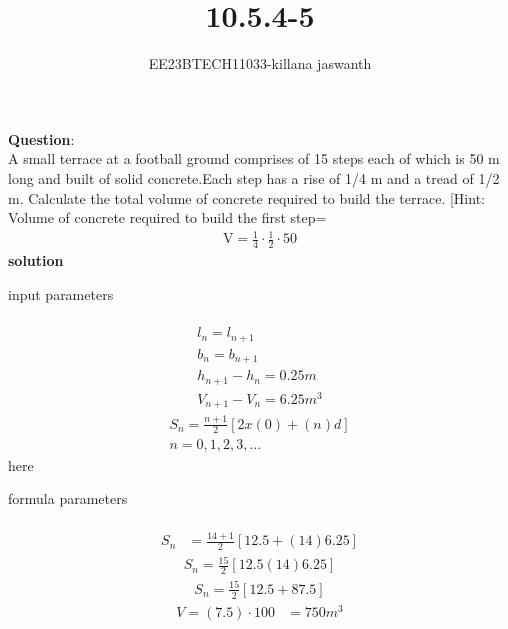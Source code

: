 \documentclass[journal,12pt,twocolumn]{IEEEtran}
\theoremstyle{remark}
\begin{document}

\vspace{3cm}

\title{10.5.4-5}
\author{EE23BTECH11033-killana jaswanth}
\maketitle
\newpage

\bigskip

\renewcommand{\thefigure}{\theenumi}
\renewcommand{\thetable}{\theenumi}
\textbf{Question}:\\
A small terrace at a football ground comprises of 15 steps each of which is 50
m long and built of solid concrete.Each step has a rise of 1/4 m and a tread of
1/2 m. Calculate the total volume of concrete required to build the terrace.
[Hint: Volume of concrete required to build the first step=\begin{align}
    \text{{V}}=\frac{1}{4} \cdot \frac{1}{2} \cdot 50 
\end{align}
\textbf{solution} 
\begin{table}[!ht]
 \centering
  
   \caption{input parameters}
   \label{tab:10.5.4.5}
   \end{table}
\begin{align}
\\l{_{n}}=l{_{n+1}}
\\b{_{n}}=b{_{n+1}}
\\h{_{n+1}}-h{_{n}}=0.25m
\\V{_{n+1}}-V{_{n}}=6.25m^3
\end{align}
\begin{align}
S_n = \frac{n+1}{2} [2x(0)+(n)d]   
\\n=0,1,2,3,...
\end{align}
here\\\begin{table}[!ht]
 \centering
  
   \caption{formula parameters}
   \label{tab:10.5.4.5}
   \end{table}
\begin{align}\\S_n &= \frac{14+1}{2} [12.5+(14)6.25]
\end{align}
\begin{align}
S_n = \frac{15}{2}[12.5(14)6.25]
\end{align}
   \begin{align}
   S_n = \frac{15}{2} [12.5+87.5]
   \end{align}
   \begin{align}
   V=(7.5) \cdot 100
   &=750m^3
   \end{align}
\end{document}
